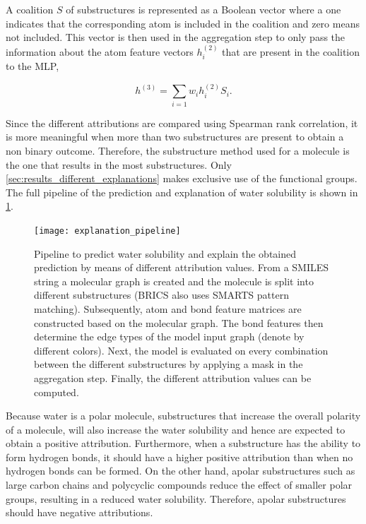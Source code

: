 A coalition $S$ of substructures is represented as a Boolean vector where a one indicates 
that the corresponding atom is included in the coalition and zero means not included. This 
vector is then used in the aggregation step to only pass the information about the atom feature 
vectors $h_i^{(2)}$ that are present in the coalition to the MLP,


\begin{equation}
    h^{(3)} = \sum_{i=1} w_i h_i^{(2)} S_i.
\end{equation}


Since the different attributions are compared using Spearman rank correlation, it 
is more meaningful when more than two substructures are present to obtain a non binary 
outcome. Therefore, the substructure method used for a molecule is the one that results 
in the most substructures. Only \cref{sec:results_different_explanations} makes exclusive 
use of the functional groups. The full pipeline of the prediction and explanation 
of water solubility is shown in \cref{fig:pipeline}.


\begin{figure}
    \centering 
    \texttt{[image: explanation\_pipeline]}
    \caption{Pipeline to predict water solubility and explain the obtained prediction by means 
        of different attribution values. From a SMILES string a molecular graph is created and 
        the molecule is split into different substructures (BRICS also uses SMARTS pattern matching).
        Subsequently, atom and bond feature matrices are constructed based on the molecular graph. The 
        bond features then determine the edge types of the model input graph (denote by different colors).
        Next, the model is evaluated on every combination between the different substructures by applying
        a mask in the aggregation step. Finally, the different attribution values can be computed.
    }
    \label{fig:pipeline}
\end{figure}


Because water is a polar molecule, substructures that increase the overall polarity 
of a molecule, will also increase the water solubility and hence are expected to obtain 
a positive attribution. Furthermore, when a substructure has the ability to form hydrogen 
bonds, it should have a higher positive attribution than when no hydrogen bonds can be 
formed. On the other hand, apolar substructures such as large carbon chains and polycyclic
compounds reduce the effect of smaller polar groups, resulting in a reduced 
water solubility. Therefore, apolar substructures should have negative attributions. 


